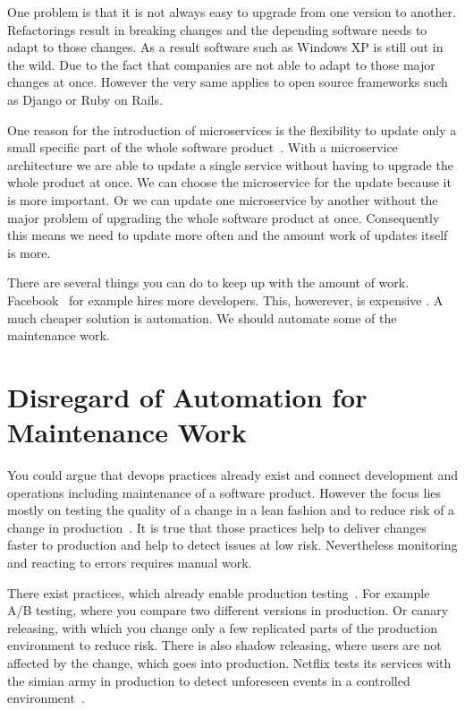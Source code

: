 One problem is that it is not always easy to upgrade from one version to
another. Refactorings result in breaking changes and the depending software needs to adapt
to those changes. As a result software such as Windows XP is still out in the wild. Due to
the fact that companies are not able to adapt to those major changes at once. However the
very same applies to open source frameworks such as Django or Ruby on Rails.

One reason for the introduction of microservices is the flexibility to update only a small
specific part of the whole software product~\cite{microservices_fowler}. With a
microservice architecture we are able to update a single service without having to upgrade
the whole product at once. We can choose the microservice for the update because it is
more important. Or we can update one microservice by another without the major problem of
upgrading the whole software product at once. Consequently this means we need to update
more often and the amount work of updates itself is more.

There are several things you can do to keep up with the amount of
work. Facebook~\cite{dev_at_fb} for example hires more developers. This, howerever, is expensive
. A much cheaper solution is automation. We should automate some of the maintenance
work.

\section{Disregard of Automation for Maintenance Work}

You could argue that devops practices already exist and connect development and operations
including maintenance of a software product. However the focus lies mostly on testing the
quality of a change in a lean fashion and to reduce risk of a change in
production~\cite{devops_definition}. It is true that those practices help to deliver
changes faster to production and help to detect issues at low risk. Nevertheless
monitoring and reacting to errors requires manual work.

There exist practices, which already enable production testing~\cite{dev_at_fb}. For
example A/B testing, where you compare two different versions in production. Or canary
releasing, with which you change only a few replicated parts of the production environment
to reduce risk. There is also shadow releasing, where users are not affected by the
change, which goes into production. Netflix tests its services with the simian army in
production to detect unforeseen events in a controlled environment~\cite{antifragile_org}.


